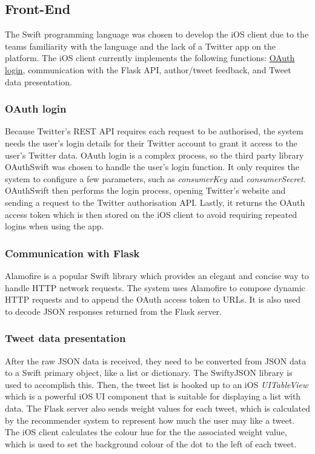 \documentclass{article}
\begin{document}
\subsection{Front-End} %
The Swift programming language was chosen to develop the iOS client due to the teams familiarity with the language and the lack of a Twitter app on the platform. The iOS client currently implements the following functions: \hyperlink{oauth}{OAuth login}, communication with the Flask API, author/tweet feedback, and Tweet data presentation.

\subsubsection*{OAuth login} %
Because Twitter's REST API requires each request to be authorised, the system needs the user's login details for their Twitter account to grant it access to the user's Twitter data. OAuth login is a complex process, so the third party library OAuthSwift \cite{oauthswift} was chosen to handle the user's login function. It only requires the system to configure a few parameters, such as \textit{consumerKey} and \textit{consumerSecret}. OAuthSwift then performs the login process, opening Twitter's website and sending a request to the Twitter authorisation API. Lastly, it returns the OAuth access token which is then stored on the iOS client to avoid requiring repeated logins when using the app.

\subsubsection*{Communication with Flask} %
Alamofire \cite{alamofire} is a popular Swift library which provides an elegant and concise way to handle HTTP network requests. The system uses Alamofire to compose dynamic HTTP requests and to append the OAuth access token to URLs. It is also used to decode JSON responses returned from the Flask server.

\subsubsection*{Tweet data presentation} %
After the raw JSON data is received, they need to be converted from JSON data to a Swift primary object, like a list or dictionary. The SwiftyJSON \cite{swiftyjson} library is used to accomplish this. Then, the tweet list is hooked up to an iOS \textit{UITableView} which is a powerful iOS UI component that is suitable for displaying a list with data. The Flask server also sends weight values for each tweet, which is calculated by the recommender system to represent how much the user may like a tweet. The iOS client calculates the colour hue for the the associated weight value, which is used to set the background colour of the dot to the left of each tweet.
\end{document}
